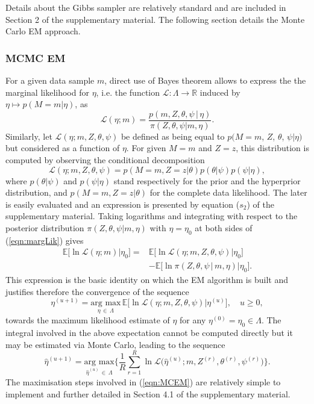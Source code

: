 \documentclass{bioinfo}
\begin{document}
Details about the Gibbs sampler are relatively standard and are
included in Section 2 of the supplementary material. The following
section details the Monte Carlo EM approach.

\subsubsection{MCMC EM}\label{sec:MCMCEM}
For a given data sample $m$, direct use of Bayes theorem
allows to  express the the marginal likelihood for $\eta$, i.e. the
function $\mathcal L: \Lambda \to \mathbb R$ induced by $\eta 
\mapsto p(M=m|\eta)$, as
\begin{equation}
  \label{eqn:margLik}
  \mathcal L(\eta; m) 
  = \frac{p(m, Z, \theta, \psi\,|\,\eta)}{\pi(Z,
      \theta, \psi|m, \eta)}.
\end{equation}
Similarly, let $\mathcal L(\eta; m, Z, \theta, \psi)$ be defined as
being equal to $p(M=m$, $Z$, $\theta$, $\psi|\eta)$ but considered as
a function of $\eta$. For given $M=m$ and $Z= z$, this distribution is
computed by observing the conditional decomposition
\[
   \mathcal L(\eta; m, Z, \theta, \psi) 
  = 
   p(M=m, Z=z|\theta) p(\theta|\psi)p(\psi|\eta), 
\]
where $p(\theta|\psi)$ and $p(\psi|\eta)$ stand respectively for the
prior and the hyperprior distribution, and $p(M=m, Z=z|\theta)$  for
the complete data likelihood. The later is easily evaluated and an
expression is presented by equation ($s_2$) of the supplementary
material. Taking logarithms and integrating with respect to the
posterior distribution $\pi(Z, \theta, \psi|m, \eta)$ with $\eta =
\eta_0$ at both sides of (\ref{eqn:margLik}) gives 
\begin{align*}
   \mathbb E\big[\ln\mathcal L(\eta; m) \big| \eta_0\big] 
  =& 
  \mathbb E\big[\ln\mathcal L(\eta; m, Z, \theta, \psi)
    \big|  \eta_0\big]\\ 
  &-
  \mathbb E\big[\ln \pi(Z, \theta, \psi\,|\,m,\eta)\big| \eta_0\big].
\end{align*}  
This expression is the basic identity on which the EM algorithm is
built and justifies therefore the convergence of the sequence
\begin{equation}
 \label{eqn:EofMCEM}
  \eta^{(u+1)} = \underset{\eta\,\in\, \Lambda}{\text{arg max}}\, 
  \mathbb E\Big[\ln\mathcal L(\eta; m, Z, \theta, \psi)\big|
  \eta^{(u)}\Big], 
  \quad u\geqslant 0,
\end{equation}
towards the maximum likelihood estimate of $\eta$ for any $\eta^{(0)}
= \eta_0  \in \Lambda$. The integral involved in the above expectation
cannot be computed directly but it may be estimated via Monte Carlo,
leading to the sequence 
\begin{equation}
 \label{eqn:MCEM}
   \hat\eta^{(u+1)}
 = 
    \underset{\hat\eta^{(u)}\,\in\,\Lambda}{\text{arg max}} 
   \bigg\{
    \frac{1}{R}\sum_{r=1}^R 
      \ln\mathcal L\Big(\hat\eta^{(u)}; m, Z^{(r)}, \theta^{(r)},
      \psi^{(r)}\Big)
   \bigg\}.
\end{equation}
The maximisation steps involved in (\ref{eqn:MCEM}) are relatively
simple to implement and further detailed in Section 4.1 of the
supplementary material.
\end{document}
